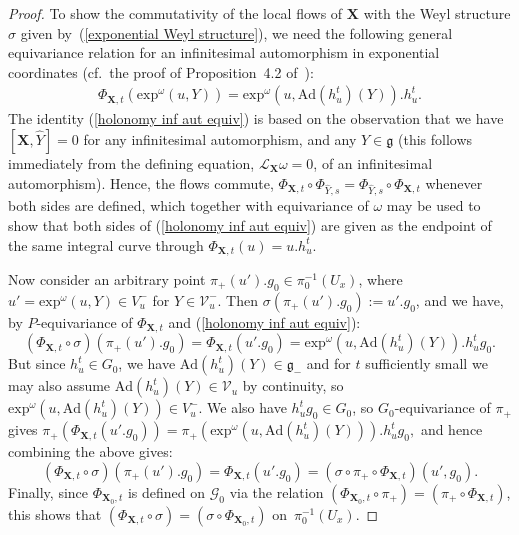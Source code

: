 \documentclass[pdftex]{sigma}
\def\g{\mathfrak{g}}
\def\Gbdle{\mathcal{G}}
\def\Lie{\mathcal{L}}
\theoremstyle{plain}
\theoremstyle{definition}
\begin{document}
\begin{proof}
To show the commutativity of the local f\/lows of $\mathbf{X}$ with the Weyl structure $\sigma$ given by~(\ref{exponential Weyl structure}), we need the following general equivariance relation for an inf\/initesimal automorphism in exponential coordinates (cf.\ the proof of Proposition~4.2 of~\cite{Frances3}):
\begin{gather}
\Phi_{\mathbf{X},t}(\mathrm{exp}^{\omega}(u,Y)) = \mathrm{exp}^{\omega}(u,\mathrm{Ad}(h_u^t)(Y)).h_u^t. \label{holonomy inf aut equiv}
\end{gather}
The identity (\ref{holonomy inf aut equiv}) is based on the observation that we have $[\mathbf{X},\hat{Y}] = 0$ for any inf\/initesimal automorphism, and any $Y \in \g$ (this follows immediately from the def\/ining equation, $\Lie_{\mathbf{X}}\omega = 0$, of an inf\/initesimal automorphism). Hence, the f\/lows commute, $\Phi_{\mathbf{X},t} \circ \Phi_{\hat{Y},s} = \Phi_{\hat{Y},s} \circ \Phi_{\mathbf{X},t}$ whenever both sides are def\/ined, which together with equivariance of $\omega$ may be used to show that both sides of (\ref{holonomy inf aut equiv}) are given as the endpoint of the same integral curve through $\Phi_{\mathbf{X},t}(u) = u.h_u^t$.

Now consider an arbitrary point $\pi_+(u').g_0 \in \pi_0^{-1}(U_x)$, where $u' = \mathrm{exp}^{\omega}(u,Y) \in V_u^-$ for $Y \in \mathcal{V}_u^-$. Then $\sigma(\pi_+(u').g_0) := u'.g_0$, and we have, by $P$-equivariance of $\Phi_{\mathbf{X},t}$ and (\ref{holonomy inf aut equiv}):
\[
(\Phi_{\mathbf{X},t} \circ \sigma)(\pi_+(u').g_0) = \Phi_{\mathbf{X},t}(u'.g_0) = \mathrm{exp}^{\omega}(u,\mathrm{Ad}(h_u^t)(Y)).h_u^tg_0.
\]
But since $h_u^t \in G_0$, we have $\mathrm{Ad}(h_u^t)(Y) \in \g_-$ and for $t$ suf\/f\/iciently small we may also assume $\mathrm{Ad}(h_u^t)(Y) \in \mathcal{V}_u$ by continuity, so $\mathrm{exp}^{\omega}(u,\mathrm{Ad}(h_u^t)(Y)) \in V_u^-$. We also have $h_u^tg_0 \in G_0$, so $G_0$-equivariance of $\pi_+$ gives $\pi_+(\Phi_{\mathbf{X},t}(u'.g_0)) = \pi_+(\mathrm{exp}^{\omega}(u,\mathrm{Ad}(h_u^t)(Y))).h_u^tg_0,$ and hence combining the above gives:
\[
(\Phi_{\mathbf{X},t} \circ \sigma)(\pi_+(u').g_0) = \Phi_{\mathbf{X},t}(u'.g_0) = (\sigma \circ \pi_+ \circ \Phi_{\mathbf{X},t})(u',g_0).
\]
Finally, since $\Phi_{\mathbf{X}_0,t}$ is def\/ined on $\Gbdle_0$ via the relation $(\Phi_{\mathbf{X}_0,t} \circ \pi_+) = (\pi_+ \circ \Phi_{\mathbf{X},t})$, this shows that $(\Phi_{\mathbf{X},t} \circ \sigma) = (\sigma \circ \Phi_{\mathbf{X}_0,t})$ on~$\pi_0^{-1}(U_x)$.
\end{proof}
\end{document}
